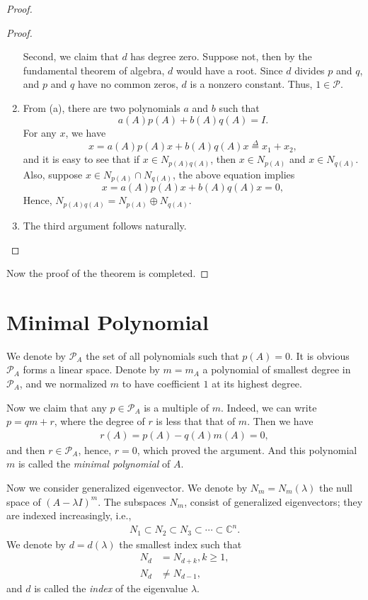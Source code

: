 \documentclass[11pt]{book}
\theoremstyle{definition}
\numberwithin{equation}{chapter}
\begin{document}
\begin{proof}
\begin{proof}
\begin{enumerate}[label=(\alph*)]
    Second, we claim that $d$ has degree zero. Suppose not, then by the fundamental theorem of algebra, $d$ would have a root. Since $d$ divides $p$ and $q$, and $p$ and $q$ have no common zeros, $d$ is a nonzero constant. Thus, $1\in \mathcal{P}$.
    \item From (a), there are two polynomials $a$ and $b$ such that 
    $$a(A)p(A) + b(A)q(A) = I.$$
    For any $x$, we have
    $$x = a(A)p(A)x + b(A)q(A)x \overset{\Delta}{=} x_1 + x_2, $$
    and it is easy to see that if $x\in N_{p(A)q(A)}$, then $x\in N_{p(A)}$ and $x\in N_{q(A)}$. Also, suppose $x\in N_{p(A)}\cap N_{q(A)}$, the above equation implies 
    $$x = a(A)p(A)x + b(A)q(A)x = 0,$$
    Hence, $N_{p(A)q(A)} = N_{p(A)} \oplus N_{q(A)}$.
    \item The third argument follows naturally.
\end{enumerate}
\end{proof}
Now the proof of the theorem is completed.
\end{proof}

\medskip

\section{Minimal Polynomial}

We denote by $\mathcal{P}_A$ the set of all polynomials such that $p(A) = 0$. It is obvious $\mathcal{P}_A$ forms a linear space. Denote by $m = m_A$ a polynomial of smallest degree in $\mathcal{P}_A$, and we normalized $m$ to have coefficient $1$ at its highest degree. 

Now we claim that any $p\in\mathcal{P}_A$ is a multiple of $m$. Indeed, we can write $p = qm +r$, where the degree of $r$ is less that that of $m$. Then we have 
\begin{align*}
    r(A) = p(A) - q(A)m(A) = 0,
\end{align*}
and then $r\in\mathcal{P}_A$, hence, $r = 0$, which proved the argument. And this polynomial $m$ is called the \emph{minimal polynomial} of $A$.

Now we consider generalized eigenvector. We denote by $N_m = N_m(\lambda)$ the null space of $(A - \lambda I)^m$. The subspaces
$N_m$, consist of generalized eigenvectors; they are indexed increasingly, i.e.,
\begin{align*}
    N_1\subset N_2 \subset N_3 \subset \cdots \subset \mathbb{C}^n.
\end{align*}
We denote by $d = d(\lambda)$ the smallest index such that
\begin{align*}
    N_d & = N_{d+k}, k\geq 1, \\
    N_d & \neq N_{d-1},
\end{align*}
and $d$ is called the \emph{index} of the eigenvalue $\lambda$.
\end{document}
